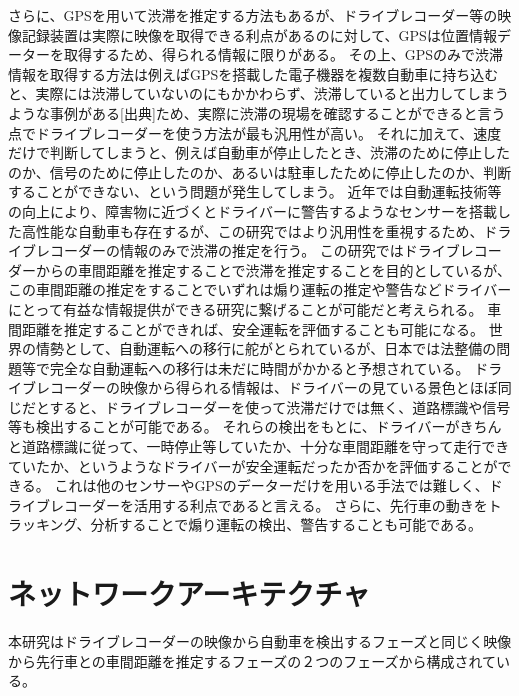 さらに、GPSを用いて渋滞を推定する方法もあるが、ドライブレコーダー等の映像記録装置は実際に映像を取得できる利点があるのに対して、GPSは位置情報データーを取得するため、得られる情報に限りがある。
その上、GPSのみで渋滞情報を取得する方法は例えばGPSを搭載した電子機器を複数自動車に持ち込むと、実際には渋滞していないのにもかかわらず、渋滞していると出力してしまうような事例がある[出典]ため、実際に渋滞の現場を確認することができると言う点でドライブレコーダーを使う方法が最も汎用性が高い。
それに加えて、速度だけで判断してしまうと、例えば自動車が停止したとき、渋滞のために停止したのか、信号のために停止したのか、あるいは駐車したために停止したのか、判断することができない、という問題が発生してしまう。
近年では自動運転技術等の向上により、障害物に近づくとドライバーに警告するようなセンサーを搭載した高性能な自動車も存在するが、この研究ではより汎用性を重視するため、ドライブレコーダーの情報のみで渋滞の推定を行う。
この研究ではドライブレコーダーからの車間距離を推定することで渋滞を推定することを目的としているが、この車間距離の推定をすることでいずれは煽り運転の推定や警告などドライバーにとって有益な情報提供ができる研究に繋げることが可能だと考えられる。
車間距離を推定することができれば、安全運転を評価することも可能になる。
世界の情勢として、自動運転への移行に舵がとられているが、日本では法整備の問題等で完全な自動運転への移行は未だに時間がかかると予想されている。
ドライブレコーダーの映像から得られる情報は、ドライバーの見ている景色とほぼ同じだとすると、ドライブレコーダーを使って渋滞だけでは無く、道路標識や信号等も検出することが可能である。
それらの検出をもとに、ドライバーがきちんと道路標識に従って、一時停止等していたか、十分な車間距離を守って走行できていたか、というようなドライバーが安全運転だったか否かを評価することができる。
これは他のセンサーやGPSのデーターだけを用いる手法では難しく、ドライブレコーダーを活用する利点であると言える。
さらに、先行車の動きをトラッキング、分析することで煽り運転の検出、警告することも可能である。


\section{ネットワークアーキテクチャ}
本研究はドライブレコーダーの映像から自動車を検出するフェーズと同じく映像から先行車との車間距離を推定するフェーズの２つのフェーズから構成されている。
